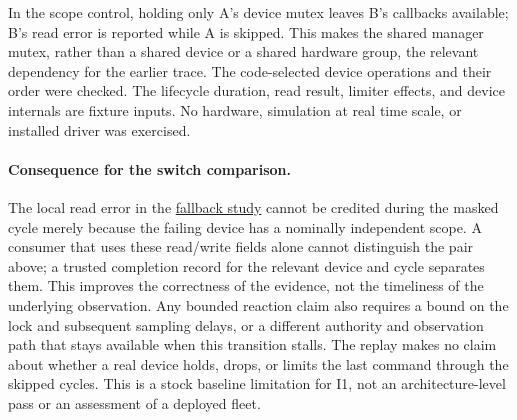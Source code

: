 \documentclass{article}
\begin{document}
In the scope control, holding only A's device mutex leaves B's
callbacks available; B's read error is reported while A is
skipped. This makes the shared manager mutex, rather than
a shared device or a shared hardware group, the relevant
dependency for the earlier trace. The code-selected device
operations and their order were checked. The lifecycle duration,
read result, limiter effects, and device internals are fixture
inputs. No hardware, simulation at real time scale, or installed
driver was exercised.

\paragraph{Consequence for the switch comparison.}
The local read error in the
\href{../local-fallback/Local_Fallback_Before_Switch_Return.tex}{fallback
study} cannot be credited during the masked cycle merely because the
failing device has a nominally independent scope. A consumer that uses
these read/write fields alone cannot distinguish the pair above;
a trusted completion record for the relevant device and cycle
separates them. This improves the correctness of the evidence,
not the timeliness of the underlying observation. Any bounded
reaction claim also requires a bound on the lock and subsequent
sampling delays, or a different authority and observation path
that stays available when this transition stalls. The replay makes
no claim about whether a real device holds, drops, or limits
the last command through the skipped cycles. This is a stock
baseline limitation for I1, not an architecture-level pass
or an assessment of a deployed fleet.
\end{document}
